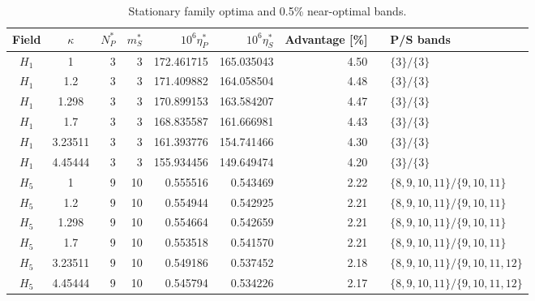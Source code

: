 \begin{table}[htbp]\centering\scriptsize
\caption{Stationary family optima and 0.5\% near-optimal bands.}\label{tab:optima}
\setlength{\tabcolsep}{4pt}
\begin{tabular}{ccrrrrrrl}\toprule
Field & $\kappa$ & $N_P^*$ & $m_S^*$ & $10^6\eta_P^*$ & $10^6\eta_S^*$ & Advantage [\%] & & P/S bands\\\midrule
$H_1$ & 1 & 3 & 3 & 172.461715 & 165.035043 & 4.50 & & $\{3\}/\{3\}$\\
$H_1$ & 1.2 & 3 & 3 & 171.409882 & 164.058504 & 4.48 & & $\{3\}/\{3\}$\\
$H_1$ & 1.298 & 3 & 3 & 170.899153 & 163.584207 & 4.47 & & $\{3\}/\{3\}$\\
$H_1$ & 1.7 & 3 & 3 & 168.835587 & 161.666981 & 4.43 & & $\{3\}/\{3\}$\\
$H_1$ & 3.23511 & 3 & 3 & 161.393776 & 154.741466 & 4.30 & & $\{3\}/\{3\}$\\
$H_1$ & 4.45444 & 3 & 3 & 155.934456 & 149.649474 & 4.20 & & $\{3\}/\{3\}$\\
$H_5$ & 1 & 9 & 10 & 0.555516 & 0.543469 & 2.22 & & $\{8,9,10,11\}/\{9,10,11\}$\\
$H_5$ & 1.2 & 9 & 10 & 0.554944 & 0.542925 & 2.21 & & $\{8,9,10,11\}/\{9,10,11\}$\\
$H_5$ & 1.298 & 9 & 10 & 0.554664 & 0.542659 & 2.21 & & $\{8,9,10,11\}/\{9,10,11\}$\\
$H_5$ & 1.7 & 9 & 10 & 0.553518 & 0.541570 & 2.21 & & $\{8,9,10,11\}/\{9,10,11\}$\\
$H_5$ & 3.23511 & 9 & 10 & 0.549186 & 0.537452 & 2.18 & & $\{8,9,10,11\}/\{9,10,11,12\}$\\
$H_5$ & 4.45444 & 9 & 10 & 0.545794 & 0.534226 & 2.17 & & $\{8,9,10,11\}/\{9,10,11,12\}$\\
\bottomrule\end{tabular}\end{table}
